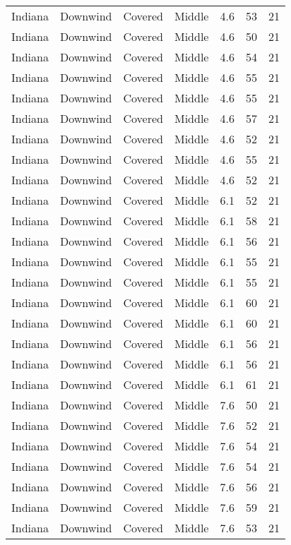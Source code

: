\documentclass{article}
\begin{document}
\begin{longtable}[H]{ccccccc}
Indiana & Downwind & Covered     & Middle & 4.6  & 53 & 21 \\
Indiana & Downwind & Covered     & Middle & 4.6  & 50 & 21 \\
Indiana & Downwind & Covered     & Middle & 4.6  & 54 & 21 \\
Indiana & Downwind & Covered     & Middle & 4.6  & 55 & 21 \\
Indiana & Downwind & Covered     & Middle & 4.6  & 55 & 21 \\
Indiana & Downwind & Covered     & Middle & 4.6  & 57 & 21 \\
Indiana & Downwind & Covered     & Middle & 4.6  & 52 & 21 \\
Indiana & Downwind & Covered     & Middle & 4.6  & 55 & 21 \\
Indiana & Downwind & Covered     & Middle & 4.6  & 52 & 21 \\
Indiana & Downwind & Covered     & Middle & 6.1  & 52 & 21 \\
Indiana & Downwind & Covered     & Middle & 6.1  & 58 & 21 \\
Indiana & Downwind & Covered     & Middle & 6.1  & 56 & 21 \\
Indiana & Downwind & Covered     & Middle & 6.1  & 55 & 21 \\
Indiana & Downwind & Covered     & Middle & 6.1  & 55 & 21 \\
Indiana & Downwind & Covered     & Middle & 6.1  & 60 & 21 \\
Indiana & Downwind & Covered     & Middle & 6.1  & 60 & 21 \\
Indiana & Downwind & Covered     & Middle & 6.1  & 56 & 21 \\
Indiana & Downwind & Covered     & Middle & 6.1  & 56 & 21 \\
Indiana & Downwind & Covered     & Middle & 6.1  & 61 & 21 \\
Indiana & Downwind & Covered     & Middle & 7.6  & 50 & 21 \\
Indiana & Downwind & Covered     & Middle & 7.6  & 52 & 21 \\
Indiana & Downwind & Covered     & Middle & 7.6  & 54 & 21 \\
Indiana & Downwind & Covered     & Middle & 7.6  & 54 & 21 \\
Indiana & Downwind & Covered     & Middle & 7.6  & 56 & 21 \\
Indiana & Downwind & Covered     & Middle & 7.6  & 59 & 21 \\
Indiana & Downwind & Covered     & Middle & 7.6  & 53 & 21 \\

\end{longtable}
\end{document}

